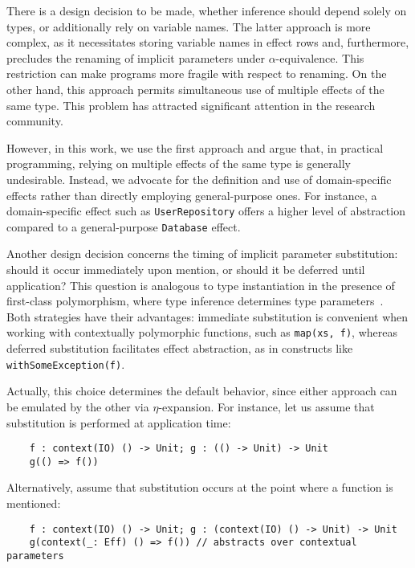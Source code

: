 \documentclass[acmsmall]{acmart}
\begin{document}
There is a design decision to be made, whether inference should depend solely on types, or additionally rely on variable names.
The latter approach is more complex, as it necessitates storing variable names in effect rows and, furthermore, precludes the renaming of implicit parameters under $\alpha$-equivalence.
This restriction can make programs more fragile with respect to renaming.
On the other hand, this approach permits simultaneous use of multiple effects of the same type.
This problem has attracted significant attention in the research community. %

However, in this work, we use the first approach and argue that, in practical programming, relying on multiple effects of the same type is generally undesirable.
Instead, we advocate for the definition and use of domain-specific effects rather than directly employing general-purpose ones.
For instance, a domain-specific effect such as \texttt{UserRepository} offers a higher level of abstraction compared to a general-purpose \texttt{Database} effect.

Another design decision concerns the timing of implicit parameter substitution: should it occur immediately upon mention, or should it be deferred until application?
This question is analogous to type instantiation in the presence of first-class polymorphism, where type inference determines type parameters~\cite{emrich2020freezeml}. %
Both strategies have their advantages: immediate substitution is convenient when working with contextually polymorphic functions, such as \texttt{map(xs, f)}, whereas deferred substitution facilitates effect abstraction, as in constructs like \texttt{withSomeException(f)}. %

Actually, this choice determines the default behavior, since either approach can be emulated by the other via $\eta$-expansion.
For instance, let us assume that substitution is performed at application time:
\begin{verbatim}
    f : context(IO) () -> Unit; g : (() -> Unit) -> Unit
    g(() => f())
\end{verbatim}
Alternatively, assume that substitution occurs at the point where a function is mentioned:
\begin{verbatim}
    f : context(IO) () -> Unit; g : (context(IO) () -> Unit) -> Unit
    g(context(_: Eff) () => f()) // abstracts over contextual parameters
\end{verbatim}
\end{document}
